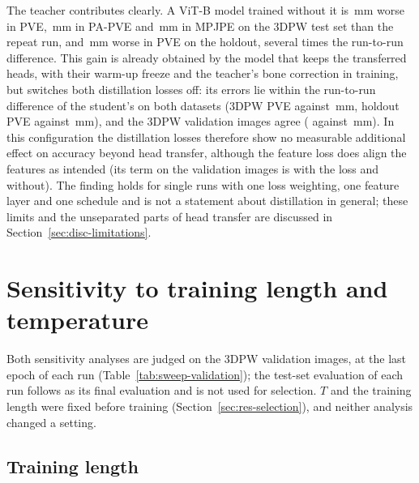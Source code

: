 The teacher contributes clearly. A ViT-B model trained without it is \AblNoTeachDiffTP\,mm worse in PVE,
\AblNoTeachDiffTPPA\,mm in PA-PVE and \AblNoTeachDiffTPMPJPE\,mm in MPJPE on the 3DPW test set than the repeat run,
and \AblNoTeachDiffHold\,mm worse in PVE on the holdout, several times the run-to-run difference. This gain is
already obtained by the model that keeps the transferred heads, with their warm-up freeze and the teacher's bone
correction in training, but switches both distillation losses off: its errors lie within the run-to-run difference
of the student's on both datasets (3DPW PVE \AblNoKDTP{} against \KDFourTP\,mm, holdout PVE \AblNoKDHold{} against
\KDFourHold\,mm), and the 3DPW validation images agree (\AblNoKDValPVE{} against \SwFourVal\,mm). In this
configuration the distillation losses therefore show no measurable additional effect on accuracy beyond head
transfer, although the feature loss does align the features as intended (its term on the validation images is
\AblFeatLossRep{} with the loss and \AblFeatLossNoKD{} without). The finding holds for single runs with one loss
weighting, one feature layer and one schedule and is not a statement about distillation in general; these limits and
the unseparated parts of head transfer are discussed in Section~\ref{sec:disc-limitations}.


\section{Sensitivity to training length and temperature}
\label{sec:res-sensitivity}



Both sensitivity analyses are judged on the \SelValImages{} 3DPW validation images, at the last epoch of each run
(Table~\ref{tab:sweep-validation}); the test-set evaluation of each run follows as its final evaluation and is not
used for selection. $T$ and the training length were fixed before training (Section~\ref{sec:res-selection}), and
neither analysis changed a setting.

\subsection{Training length}
\label{sec:res-training-length}



